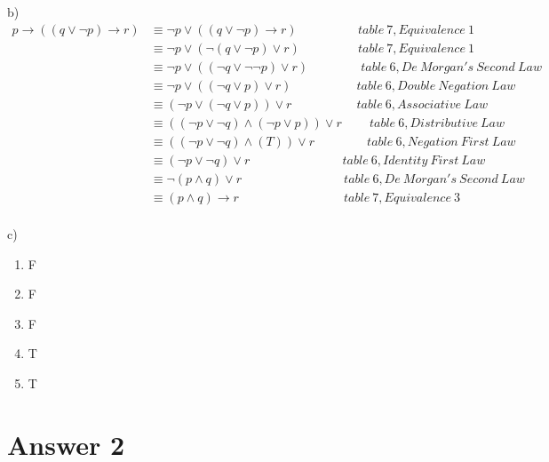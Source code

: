 \documentclass[12pt]{article}
\begin{document}
b)\\
\begin{equation*}
\begin{split}
 p \rightarrow ((q \vee \neg p) \rightarrow r) &
 \equiv \neg p \vee ((q \vee \neg p) \rightarrow r)\ \ \ \qquad \quad\quad \ table\ 7, Equivalence \ 1\\
 &
 \equiv \neg p \vee (\neg(q \vee \neg p) \vee r)\ \ \ \quad \quad \quad\quad table\ 7, Equivalence\ 1\\
 &
 \equiv \neg p \vee ((\neg q \vee \neg \neg p) \vee r) \quad \quad\quad \quad \ table\ 6, De\ Morgan's\ Second\ Law\\ &
 \equiv \neg p \vee ((\neg q \vee  p) \vee r) \quad \quad \quad \quad\quad\ table\ 6, Double\  Negation\ Law\\ &
 \equiv (\neg p \vee (\neg q \vee  p)) \vee r \quad \quad \quad \quad\quad\ table\ 6, Associative\ Law\\ &
 \equiv ((\neg p \vee \neg q) \wedge(\neg p  \vee  p)) \vee r \quad  \quad \ table\ 6, Distributive \ Law\\ &
 \equiv ((\neg p \vee \neg q) \wedge(T)) \vee r \quad \quad \quad \quad \ table\ 6, Negation \ First \ Law\\ &
 \equiv (\neg p \vee \neg q)  \vee r \quad \quad \quad\quad\quad\quad\quad\ \ table\ 6, Identity\ First\ Law\\ &
 \equiv \neg( p \wedge  q)  \vee r \quad \quad \quad \quad\quad\quad\quad\quad\ table\ 6, De\ Morgan's\ Second\ Law\\ &
 \equiv ( p \wedge  q)  \rightarrow r \quad \quad \quad \quad\quad\quad\quad\quad \ \ table\ 7, Equivalence\ 3\\
\end{split}
\end{equation*}

c)\\


\begin{enumerate}
\centering
    \item F
    \item F
    \item F
    \item T
    \item T
\end{enumerate}

\section*{Answer 2}
\end{document}
